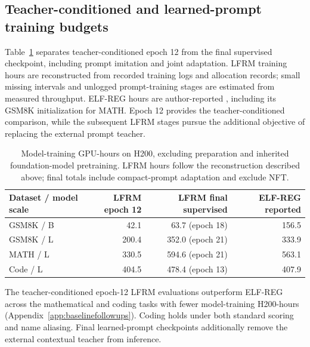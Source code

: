 \documentclass{article}
\newenvironment{revision}{\begingroup\color{blue}}{\endgroup}
\begin{document}
\begin{revision}
\subsection{Teacher-conditioned and learned-prompt training budgets}
Table~\ref{tab:trainingbudgets} separates teacher-conditioned epoch 12 from the final supervised checkpoint, including prompt imitation and joint adaptation. LFRM training hours are reconstructed from recorded training logs and allocation records; small missing intervals and unlogged prompt-training stages are estimated from measured throughput. ELF-REG hours are author-reported \citep[Table 7]{scalingdlm}, including its GSM8K initialization for MATH. Epoch 12 provides the teacher-conditioned comparison, while the subsequent LFRM stages pursue the additional objective of replacing the external prompt teacher.
\begin{table}[htbp]\color{blue}\centering\small
\caption{Model-training GPU-hours on H200, excluding preparation and inherited foundation-model pretraining. LFRM hours follow the reconstruction described above; final totals include compact-prompt adaptation and exclude NFT.}
\label{tab:trainingbudgets}
\begin{tabular}{@{}lrrr@{}}\toprule
Dataset / model scale & LFRM epoch 12 & LFRM final supervised & ELF-REG reported\\\midrule
GSM8K / B & 42.1 & 63.7 (epoch 18) & 156.5\\
GSM8K / L & 200.4 & 352.0 (epoch 21) & 333.9\\
MATH / L & 330.5 & 594.6 (epoch 21) & 563.1\\
Code / L & 404.5 & 478.4 (epoch 13) & 407.9\\\bottomrule
\end{tabular}
\end{table}
The teacher-conditioned epoch-12 LFRM evaluations outperform ELF-REG across the mathematical and coding tasks with fewer model-training H200-hours (Appendix~\ref{app:baselinefollowups}). Coding holds under both standard scoring and name aliasing. Final learned-prompt checkpoints additionally remove the external contextual teacher from inference.


\end{revision}
\end{document}
